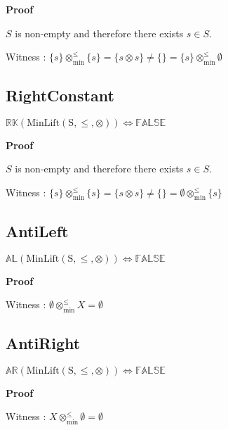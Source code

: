 \documentclass[10pt]{article}
\newcommand{\propname}[1]{{\mathbb{#1}}}
\newcommand{\minlift}{\otimes_{\min}^{\leq}}
\newcommand{\proof}{\vspace{1em} \textbf{Proof} \vspace{1em}}
\begin{document}
\proof

$S$ is non-empty and therefore there exists $s \in S$.

\vspace{0.5em}

Witness : $\{s\} \minlift \{s\} = \{s \otimes s\} \neq \{\} = \{s\} \minlift \emptyset$



\subsection{RightConstant}
$\propname{RK}(\mathrm{MinLift(S,\leq,\otimes)}) \Leftrightarrow \propname{FALSE}$

\proof

$S$ is non-empty and therefore there exists $s \in S$.

\vspace{0.5em}

Witness : $\{s\} \minlift \{s\} = \{s \otimes s\} \neq \{\} = \emptyset \minlift \{s\}$



\subsection{AntiLeft}
$\propname{AL}(\mathrm{MinLift(S,\leq,\otimes)}) \Leftrightarrow \propname{FALSE}$

\proof

Witness : $\emptyset \minlift X = \emptyset$



\subsection{AntiRight}
$\propname{AR}(\mathrm{MinLift(S,\leq,\otimes)}) \Leftrightarrow \propname{FALSE}$

\proof

Witness : $X \minlift \emptyset = \emptyset$
\end{document}
